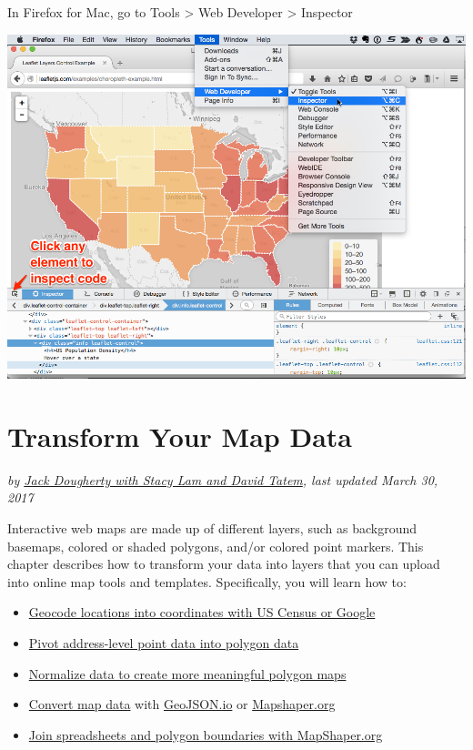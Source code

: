 \documentclass[
  english,
]{book}
\providecommand{\tightlist}{%
  \setlength{\itemsep}{0pt}\setlength{\parskip}{0pt}}
\begin{document}
In Firefox for Mac, go to Tools \textgreater{} Web Developer \textgreater{} Inspector

\includegraphics{images/08-github/Firefox-tools-inspector.png}

\hypertarget{transform}{%
\chapter{Transform Your Map Data}\label{transform}}

\emph{by \href{authors}{Jack Dougherty with Stacy Lam and David Tatem}, last updated March 30, 2017}

Interactive web maps are made up of different layers, such as background basemaps, colored or shaded polygons, and/or colored point markers. This chapter describes how to transform your data into layers that you can upload into online map tools and templates. Specifically, you will learn how to:

\begin{itemize}
\tightlist
\item
  \href{geocode}{Geocode locations into coordinates with US Census or Google}
\item
  \href{pivot-point-to-polygon}{Pivot address-level point data into polygon data}
\item
  \href{normalize}{Normalize data to create more meaningful polygon maps}
\item
  \href{convert-geojson}{Convert map data} with \href{geojsonio}{GeoJSON.io} or \href{mapshaper}{Mapshaper.org}
\item
  \href{mapshaper}{Join spreadsheets and polygon boundaries with MapShaper.org}
\end{itemize}
\end{document}
